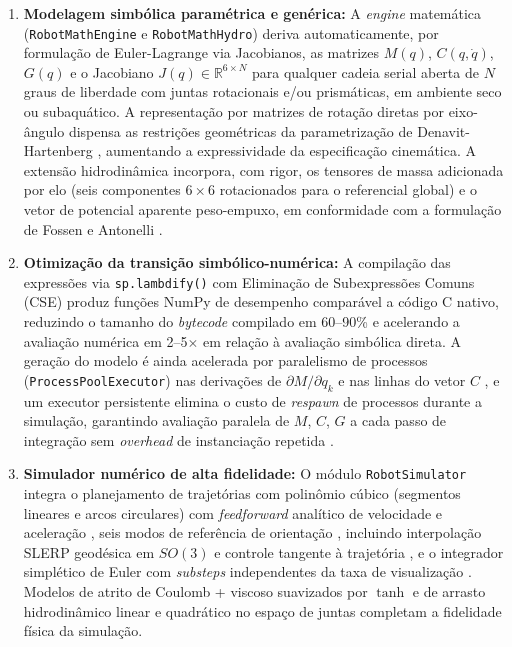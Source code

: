 \begin{enumerate}
    \item \textbf{Modelagem simbólica paramétrica e genérica:} A \textit{engine} matemática (\texttt{RobotMathEngine} e \texttt{RobotMathHydro}) deriva automaticamente, por formulação de Euler-Lagrange via Jacobianos, as matrizes $M(q)$, $C(q,\dot{q})$, $G(q)$ e o Jacobiano $J(q) \in \mathbb{R}^{6 \times N}$ para qualquer cadeia serial aberta de $N$ graus de liberdade com juntas rotacionais e/ou prismáticas, em ambiente seco ou subaquático. A representação por matrizes de rotação diretas por eixo-ângulo \cite{craig1989introduction, spong2020robot} dispensa as restrições geométricas da parametrização de Denavit-Hartenberg \cite{denavit1955kinematic}, aumentando a expressividade da especificação cinemática. A extensão hidrodinâmica incorpora, com rigor, os tensores de massa adicionada por elo (seis componentes $6 \times 6$ rotacionados para o referencial global) e o vetor de potencial aparente peso-empuxo, em conformidade com a formulação de Fossen \cite{fossen2011handbook} e Antonelli \cite{antonelli2014modelling}.

    \item \textbf{Otimização da transição simbólico-numérica:} A compilação das expressões via \texttt{sp.lambdify()} com Eliminação de Subexpressões Comuns (CSE) \cite{meurer2017sympy, alfred2007compilers} produz funções NumPy de desempenho comparável a código C nativo, reduzindo o tamanho do \textit{bytecode} compilado em 60--90\% e acelerando a avaliação numérica em 2--5$\times$ em relação à avaliação simbólica direta. A geração do modelo é ainda acelerada por paralelismo de processos (\texttt{ProcessPoolExecutor}) nas derivações de $\partial M/\partial q_k$ e nas linhas do vetor $C$ \cite{hollerbach1980recursive, beazley2010understanding}, e um executor persistente elimina o custo de \textit{respawn} de processos durante a simulação, garantindo avaliação paralela de $M$, $C$, $G$ a cada passo de integração sem \textit{overhead} de instanciação repetida \cite{leu1986automated}.

    \item \textbf{Simulador numérico de alta fidelidade:} O módulo \texttt{RobotSimulator} integra o planejamento de trajetórias com polinômio cúbico (segmentos lineares e arcos circulares) com \textit{feedforward} analítico de velocidade e aceleração \cite{siciliano2009robotics}, seis modos de referência de orientação , incluindo interpolação SLERP geodésica em $SO(3)$ \cite{shoemake1985animating, dam1998quaternions} e controle tangente à trajetória , e o integrador simplético de Euler com \textit{substeps} independentes da taxa de visualização \cite{leimkuhler2004simulating, hairer2006geometric}. Modelos de atrito de Coulomb + viscoso suavizados por $\tanh$ \cite{slotine1991applied} e de arrasto hidrodinâmico linear e quadrático no espaço de juntas \cite{fossen2011handbook, antonelli2014modelling} completam a fidelidade física da simulação.


\end{enumerate}
